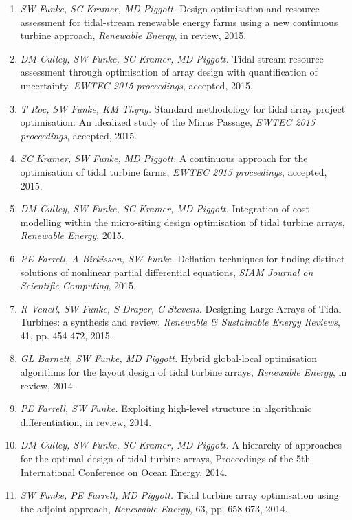 \documentclass[11pt]{article}
\begin{document}
\newpage
{}
\begin{enumerate}
\item \textit{SW Funke, SC Kramer, MD Piggott.} Design optimisation and resource assessment for tidal-stream renewable energy farms using a new continuous turbine approach, \textit{Renewable Energy}, in review, 2015.
\item \textit{DM Culley, SW Funke, SC Kramer, MD Piggott.} Tidal stream resource assessment through optimisation of array design with quantification of uncertainty, \textit{EWTEC 2015 proceedings}, accepted, 2015.
\item \textit{T Roc, SW Funke, KM Thyng.} Standard methodology for tidal array project optimisation: An idealized study of the Minas Passage, \textit{EWTEC 2015 proceedings}, accepted, 2015.
\item \textit{SC Kramer, SW Funke, MD Piggott.} A continuous approach for the optimisation of tidal turbine farms, \textit{EWTEC 2015 proceedings}, accepted, 2015.
\item \textit{DM Culley, SW Funke, SC Kramer, MD Piggott.} Integration of cost modelling within the micro-siting design optimisation of tidal turbine arrays, \textit{Renewable Energy}, 2015.
\item \textit{PE Farrell, A Birkisson, SW Funke.} Deflation techniques for finding distinct solutions of nonlinear partial differential equations, \textit{SIAM Journal on Scientific Computing}, 2015.
\item \textit{R Venell, SW Funke, S Draper, C Stevens.} Designing Large Arrays of Tidal Turbines: a synthesis and review, \textit{Renewable \& Sustainable Energy Reviews}, 41, pp. 454-472, 2015.
\item \textit{GL Barnett, SW Funke, MD Piggott.} Hybrid global-local optimisation algorithms for the layout design of tidal turbine arrays, \textit{Renewable Energy}, in review, 2014.
\item \textit{PE Farrell, SW Funke.} Exploiting high-level structure in
    algorithmic differentiation, in review, 2014.
\item \textit{DM Culley, SW Funke, SC Kramer, MD Piggott.} A hierarchy of approaches for the optimal design of tidal turbine arrays, Proceedings of the 5th International Conference on Ocean Energy, 2014.
\item \textit{SW Funke, PE Farrell, MD Piggott.} Tidal turbine array optimisation using the adjoint approach, \textit{Renewable Energy}, 63, pp. 658-673,  2014.

\end{enumerate}
\end{document}

